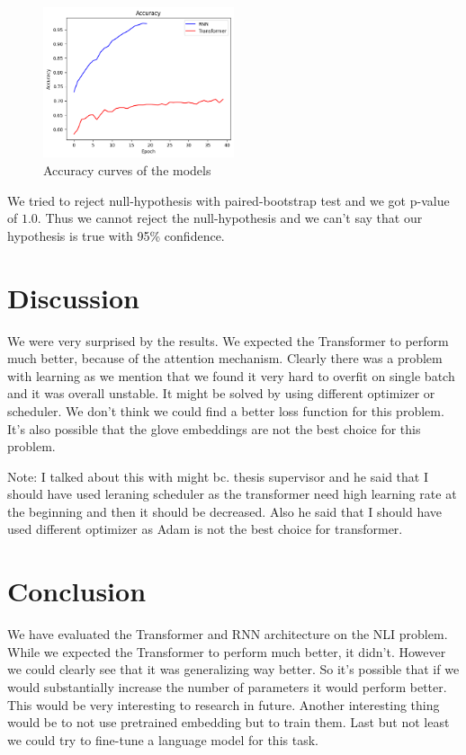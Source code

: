 \documentclass{article}
\begin{document}
    \begin{figure}[h!]
        \centering
        \includegraphics[width=0.5\textwidth]{Accuracy.png}
        \caption{Accuracy curves of the models}
        \label{fig:acc_curves}
    \end{figure}
    We tried to reject null-hypothesis with paired-bootstrap test and we got p-value of $1.0$.
    Thus we cannot reject the null-hypothesis and we can't say that our hypothesis is true with 95\% confidence.

    \section{Discussion}
    We were very surprised by the results. We expected the Transformer to perform much better, because
    of the attention mechanism. Clearly there was a problem with learning as we mention that we found it very hard
    to overfit on single batch and it was overall unstable. It might be solved by using different optimizer or scheduler. We don't think we could find
    a better loss function for this problem. It's also possible that the glove embeddings are not the best choice for this problem.

    Note: I talked about this with might bc. thesis supervisor and he said that I should have used leraning scheduler as the transformer need high learning rate at the beginning and then it should be decreased.
    Also he said that I should have used different optimizer as Adam is not the best choice for transformer.

    \section{Conclusion}
    We have evaluated the Transformer and RNN architecture on the NLI problem.
    While we expected the Transformer to perform much better, it didn't. However we could clearly see that it was generalizing way better.
    So it's possible that if we would substantially increase the number of parameters it would perform better. This would be very interesting to research in future.
    Another interesting thing would be to not use pretrained embedding but to train them. Last but not least we could try to fine-tune a language model for this task.


    \printbibliography{}
\end{document}
